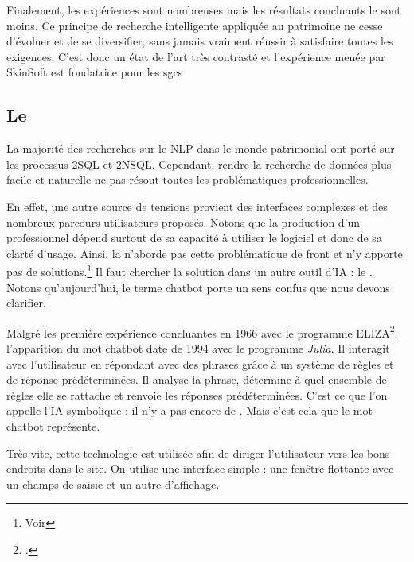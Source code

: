 Finalement, les expériences sont nombreuses mais les résultats concluants le sont moins. Ce principe de recherche intelligente appliquée au patrimoine ne cesse d'évoluer et de se diversifier, sans jamais vraiment réussir à satisfaire toutes les exigences. C'est donc un état de l'art très contrasté et l'expérience menée par SkinSoft est fondatrice pour les \glspl{sgc}

\subsection{Le }

La majorité des recherches sur le \gls{NLP} dans le monde patrimonial ont porté sur les processus \gls{2SQL} et \gls{2NSQL}. Cependant, rendre la recherche de données plus facile et naturelle ne pas résout toutes les problématiques professionnelles.

En effet, une autre source de tensions provient des interfaces complexes et des nombreux parcours utilisateurs proposés. Notons que la production d'un professionnel dépend surtout de sa capacité à utiliser le logiciel et donc de sa clarté d'usage. Ainsi, la  n'aborde pas cette problématique de front et n'y apporte pas de solutions.\footnote{Voir } 
Il faut chercher la solution dans un autre outil d'\gls{IA} : le . Notons qu'aujourd'hui, le terme \gls{chatbot} porte un sens confus que nous devons clarifier.\newline

Malgré les première expérience concluantes en 1966 avec le programme ELIZA\footcite{adamopoulouChatbotsHistoryTechnology2020}, l'apparition du mot \gls{chatbot} date de 1994 avec le programme \textit{Julia}. Il interagit avec l'utilisateur en répondant avec des phrases grâce à un système de règles et de réponse prédéterminées. Il analyse la phrase, détermine à quel ensemble de règles elle se rattache et renvoie les réponses prédéterminées. C'est ce que l'on appelle l'\gls{IA} symbolique : il n'y a pas encore de . Mais c'est cela que le mot \gls{chatbot} représente. 

Très vite, cette technologie est utilisée afin de diriger l'utilisateur vers les bons endroits dans le site. On utilise une interface simple : une fenêtre flottante avec un champs de saisie et un autre d'affichage.\newline

